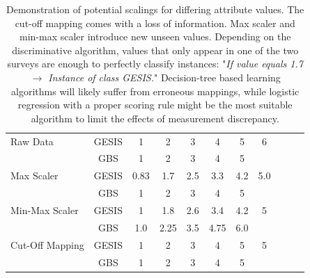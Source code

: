 \begin{table}[ht]
    \begin{center}
            {\footnotesize
            \begin{tabular}{l|c|ccccccccc}
                \hline \hline
		Raw Data & GESIS & 1 & 2 & 3 & 4 & 5 & 6 \\
                     & GBS & 1 & 2 & 3 & 4 & 5 & \\
                \hline
		Max Scaler & GESIS & 0.83 & 1.7 & 2.5 & 3.3 & 4.2 & 5.0 \\
                     & GBS & 1 & 2 & 3 & 4 & 5 & \\
                \hline
		Min-Max Scaler & GESIS & 1 & 1.8 & 2.6 & 3.4 & 4.2 & 5 \\
                     & GBS & 1.0 & 2.25 & 3.5 & 4.75 & 6.0 & \\
                \hline
		Cut-Off Mapping & GESIS & 1 & 2 & 3 & 4 & 5 & 5 \\
                     & GBS & 1 & 2 & 3 & 4 & 5 & \\
	     \hline \hline
            \end{tabular}}
        \caption{Demonstration of potential scalings for differing attribute values. The cut-off mapping comes with a loss of information. Max scaler and min-max scaler introduce new unseen values. Depending on the discriminative algorithm, values ​​that only appear in one of the two surveys are enough to perfectly classify instances: "\textit{If value equals 1.7  \(\rightarrow\) Instance of class GESIS.}" Decision-tree based learning algorithms will likely suffer from erroneous mappings, while logistic regression with a proper scoring rule might be the most suitable algorithm to limit the effects of measurement discrepancy.}
\label{Tab:DescripStatsRawData}
\end{center}
\end{table}

